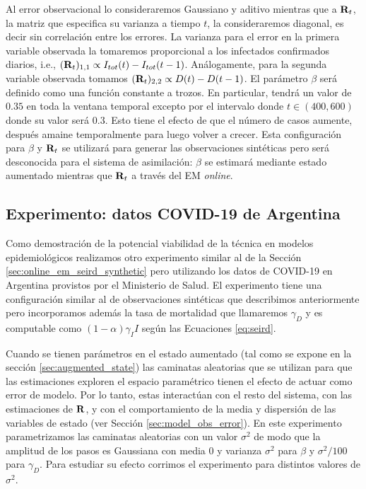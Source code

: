 Al error observacional lo consideraremos Gaussiano y aditivo mientras que a $\mathbf{R}_t$, la matriz que especifica su varianza a tiempo $t$, la consideraremos diagonal, es decir sin correlación entre los errores. La varianza para el error en la primera variable observada la tomaremos proporcional a los infectados confirmados diarios,  i.e., $(\mathbf{R}_t)_{1,1} \propto I_{tot}(t) - I_{tot}(t-1)$. Análogamente, para la segunda variable observada tomamos $(\mathbf{R}_t)_{2,2} \propto D(t) - D(t-1)$. El parámetro $\beta$ será definido como una función constante a trozos. En particular, tendrá un valor de $0.35$ en toda la ventana temporal excepto por el intervalo donde $t \in (400, 600)$ donde su valor será $0.3$. Esto tiene el efecto de que el número de casos aumente, después amaine temporalmente para luego volver a crecer. Esta configuración para $\beta$ y $\mathbf{R}_t$ se utilizará para generar las observaciones sintéticas pero será desconocida para el sistema de asimilación: $\beta$ se estimará mediante estado aumentado mientras que $\mathbf{R}_t$ a través del EM \textit{online}.

\subsection{Experimento: datos COVID-19 de Argentina}
Como demostración de la potencial viabilidad de la técnica en modelos epidemiológicos realizamos otro experimento similar al de la Sección \ref{sec:online_em_seird_synthetic} pero utilizando los datos de COVID-19 en Argentina provistos por el Ministerio de Salud. El experimento tiene una configuración similar al de observaciones sintéticas que describimos anteriormente pero incorporamos además la tasa de mortalidad que llamaremos $\gamma_D$ y es computable como $(1-\alpha) \gamma_I I$ según las Ecuaciones \ref{eq:seird}.

Cuando se tienen parámetros en el estado aumentado (tal como se expone en la sección \ref{sec:augmented_state}) las caminatas aleatorias que se utilizan para que las estimaciones exploren el espacio paramétrico tienen el efecto de actuar como error de modelo. Por lo tanto, estas interactúan con el resto del sistema, con las estimaciones de $\mathbf{R}$, y con el comportamiento de la media y dispersión de las variables de estado (ver Sección \ref{sec:model_obs_error}). En este experimento parametrizamos las caminatas aleatorias con un valor $\sigma^2$ de modo que la amplitud de los pasos es Gaussiana con media 0 y varianza $\sigma^2$ para $\beta$ y $\sigma^2/100$ para $\gamma_D$. Para estudiar su efecto corrimos el experimento para distintos valores de $\sigma^2$. 

